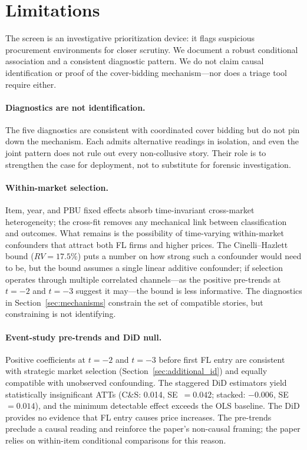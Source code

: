 \section{Limitations}
\label{sec:limitations}

The screen is an investigative prioritization device: it flags
suspicious procurement environments for closer scrutiny. We document
a robust conditional association and a consistent diagnostic
pattern. We do not claim causal identification or proof of the
cover-bidding mechanism---nor does a triage tool require either.

\paragraph{Diagnostics are not identification.}
The five diagnostics are consistent with coordinated cover bidding
but do not pin down the mechanism. Each admits alternative readings
in isolation, and even the joint pattern does not rule out every
non-collusive story. Their role is to strengthen the case for
deployment, not to substitute for forensic investigation.

\paragraph{Within-market selection.}
Item, year, and PBU fixed effects absorb time-invariant cross-market
heterogeneity; the cross-fit removes any mechanical link between
classification and outcomes. What remains is the possibility of
time-varying within-market confounders that attract both FL firms and
higher prices. The Cinelli--Hazlett bound ($RV = 17.5\%$) puts a
number on how strong such a confounder would need to be, but the
bound assumes a single linear additive confounder; if selection
operates through multiple correlated channels---as the positive
pre-trends at $t = -2$ and $t = -3$ suggest it
may---the bound is less informative.
The diagnostics in Section~\ref{sec:mechanisms} constrain the set of
compatible stories, but constraining is not identifying.

\paragraph{Event-study pre-trends and DiD null.}
Positive coefficients at $t = -2$ and $t = -3$ before first FL
entry are consistent with strategic market selection
(Section~\ref{sec:additional_id}) and equally compatible with
unobserved confounding. The staggered DiD estimators yield
statistically insignificant ATTs (C\&S: 0.014, SE~$= 0.042$;
stacked: $-0.006$, SE~$= 0.014$), and the minimum detectable
effect exceeds the OLS baseline. The DiD provides no evidence
that FL entry causes price increases. The pre-trends preclude
a causal reading and reinforce the paper's non-causal framing;
the paper relies on within-item conditional comparisons for
this reason.

